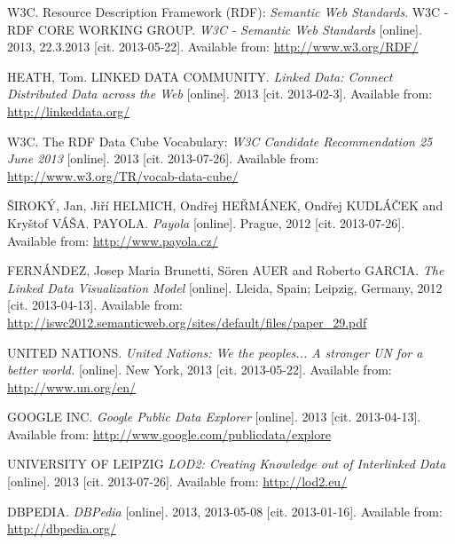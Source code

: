 
\def\bibname{Bibliography}
\begin{thebibliography}{99}
\addcontentsline{toc}{chapter}{\bibname}

{\sc W3C}. 
Resource Description Framework (RDF): \emph{Semantic Web Standards}.
W3C - RDF CORE WORKING GROUP. 
\emph{W3C - Semantic Web Standards} [online].
2013, 22.3.2013 [cit. 2013-05-22].
Available from: \url{http://www.w3.org/RDF/}

{\sc HEATH,} Tom.
LINKED DATA COMMUNITY. \emph{Linked Data: Connect Distributed Data across the Web}
[online]. 2013 [cit. 2013-02-3]. 
Available from: \url{http://linkeddata.org/}

{\sc W3C.}
The RDF Data Cube Vocabulary:
\emph{W3C Candidate Recommendation 25 June 2013} [online]. 2013
[cit. 2013-07-26]. Available from: \url{http://www.w3.org/TR/vocab-data-cube/}

{\sc ŠIROKÝ}, Jan, Jiří HELMICH, Ondřej HEŘMÁNEK, Ondřej KUDLÁČEK and Kryštof VÁŠA.
PAYOLA. \emph{Payola} [online]. Prague, 2012 [cit. 2013-07-26]. 
Available from: \url{http://www.payola.cz/}

 {\sc FERNÁNDEZ,} Josep Maria Brunetti, Sören AUER and Roberto GARCIA.
 \emph{The Linked Data Visualization Model}
 [online]. Lleida, Spain; Leipzig, Germany, 2012
 [cit. 2013-04-13].
 Available from: \url{http://iswc2012.semanticweb.org/sites/default/files/paper_29.pdf}

{\sc UNITED NATIONS.}
\emph{United Nations: We the peoples... A stronger UN for a better world.} [online].
New York, 2013 [cit. 2013-05-22]. 
Available from: \url{http://www.un.org/en/}

  {\sc } GOOGLE INC.
  \emph{Google Public Data Explorer}
  [online]. 2013 [cit. 2013-04-13]. Available from: \url{http://www.google.com/publicdata/explore}

{\sc UNIVERSITY OF LEIPZIG}
\emph{LOD2: Creating Knowledge out of Interlinked Data} [online]. 2013
[cit. 2013-07-26].
Available from: \url{http://lod2.eu/}

{\sc DBPEDIA.} 
\emph{DBPedia} [online]. 2013, 2013-05-08 [cit. 2013-01-16]. 
Available from: \url{http://dbpedia.org/}


\end{thebibliography}
